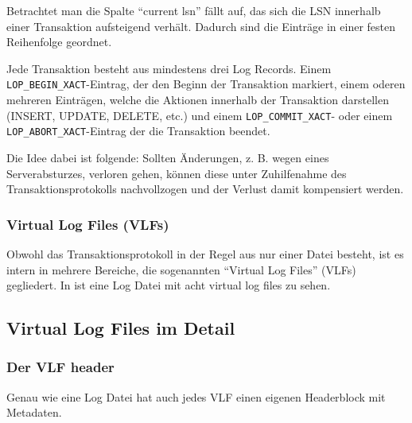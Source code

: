           Betrachtet man die Spalte \enquote{current lsn} fällt auf, das sich
          die LSN innerhalb einer Transaktion aufsteigend verhält. Dadurch sind
          die Einträge in einer festen Reihenfolge geordnet.
          \begin{merke}
            Jede Transaktion besteht aus mindestens drei Log Records. Einem
            \texttt{LOP\_BEGIN\_XACT}-Eintrag, der den Beginn der Transaktion
            markiert, einem oderen mehreren Einträgen, welche die Aktionen
            innerhalb der Transaktion darstellen (INSERT, UPDATE, DELETE, etc.)
            und einem \texttt{LOP\_COMMIT\_XACT}- oder einem
            \texttt{LOP\_ABORT\_XACT}-Eintrag der die Transaktion beendet.
          \end{merke}
          Die Idee dabei ist folgende: Sollten Änderungen, z. B. wegen eines
          Serverabsturzes, verloren gehen, können diese unter Zuhilfenahme des
          Transaktionsprotokolls nachvollzogen und der Verlust damit kompensiert werden.
          \begin{literaturinternet}
            \item \cite{ms180892}
          \end{literaturinternet}
        \subsubsection{Virtual Log Files (VLFs)}
          Obwohl das Transaktionsprotokoll in der Regel aus nur einer Datei
          besteht, ist es intern in mehrere Bereiche, die sogenannten
          \enquote{Virtual Log Files} (VLFs) gegliedert. 
           In 
          ist eine Log Datei mit acht virtual log files zu sehen. 
      \subsection{Virtual Log Files im Detail}
        \subsubsection{Der VLF header}
          Genau wie eine Log Datei hat auch jedes VLF einen eigenen Headerblock
          mit Metadaten.
